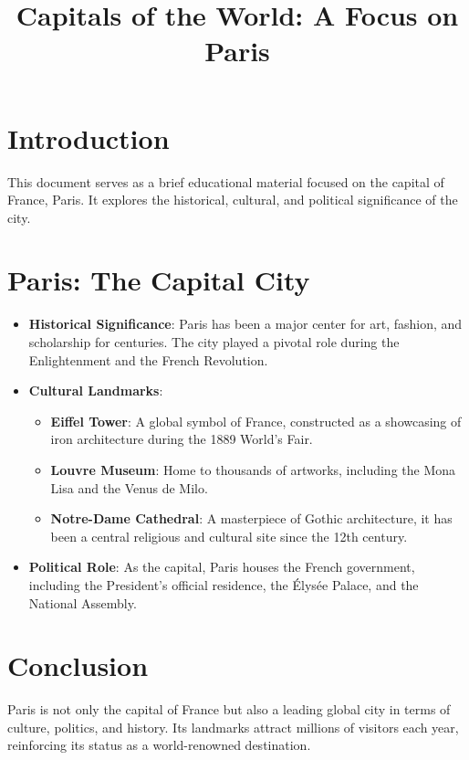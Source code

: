 \documentclass[12pt]{article}
\title{Capitals of the World: A Focus on Paris}
\author{}
\date{}
\begin{document}
  
\maketitle  
\section*{Introduction}  
This document serves as a brief educational material focused on the capital of France, Paris. It explores the historical, cultural, and political significance of the city.  
\section*{Paris: The Capital City}  
\begin{itemize}  
\item \textbf{Historical Significance}:  
Paris has been a major center for art, fashion, and scholarship for centuries. The city played a pivotal role during the Enlightenment and the French Revolution.  
\item \textbf{Cultural Landmarks}:  
\begin{itemize}  
\item \textbf{Eiffel Tower}: A global symbol of France, constructed as a showcasing of iron architecture during the 1889 World’s Fair.  
\item \textbf{Louvre Museum}: Home to thousands of artworks, including the Mona Lisa and the Venus de Milo.  
\item \textbf{Notre-Dame Cathedral}: A masterpiece of Gothic architecture, it has been a central religious and cultural site since the 12th century.  
\end{itemize}  
\item \textbf{Political Role}:  
As the capital, Paris houses the French government, including the President’s official residence, the Élysée Palace, and the National Assembly.  
\end{itemize}  
\section*{Conclusion}  
Paris is not only the capital of France but also a leading global city in terms of culture, politics, and history. Its landmarks attract millions of visitors each year, reinforcing its status as a world-renowned destination.  
\end{document}
